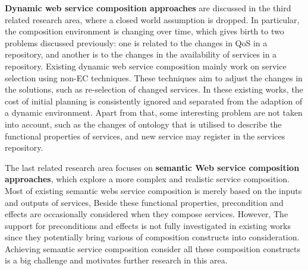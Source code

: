 \textbf{Dynamic web service composition approaches} are discussed in the third related research area, where a closed world assumption is dropped. In particular, the composition environment is changing over time, which gives birth to two problems discussed previously: one is related to the changes in QoS in a repository, and another is to the changes in the availability of services in a repository. Existing dynamic web service composition mainly work on service selection using non-EC techniques. These techniques aim to adjust the changes in the solutions, such as re-selection of changed services.  In these existing works, the cost of initial planning is consistently ignored and separated from the adaption of a dynamic environment. Apart from that, some interesting problem are not taken into account, such as the changes of ontology that is utilised to describe the functional properties of services,  and new service may register in the services repository.

The last related research area focuses on \textbf{semantic Web service composition approaches}, which explore a more complex and realistic service composition. Most of existing semantic webs service composition is merely based on the inputs and outputs of services, Beside these functional properties,  precondition and effects are occasionally considered when they compose services. However,   The support for preconditions and effects is not fully investigated in existing works since they potentially bring various of composition constructs into consideration. Achieving semantic service composition consider all these composition constructs is a big challenge and motivates further research in this area.

